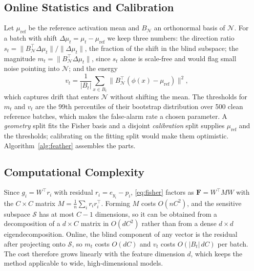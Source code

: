 \documentclass[conference]{IEEEtran}
\newcommand{\F}{\mathbf{F}}
\newcommand{\act}{\phi}
\begin{document}
\subsection{Online Statistics and Calibration}
\label{sec:stats}

Let $\mu_{\mathrm{ref}}$ be the reference activation mean and $B_\mathcal{N}$
an orthonormal basis of $\mathcal{N}$. For a batch with shift
$\Delta\mu_t = \mu_t - \mu_{\mathrm{ref}}$ we keep three numbers: the
direction ratio
$s_t = \lVert B_\mathcal{N}^\top \Delta\mu_t\rVert / \lVert \Delta\mu_t\rVert$,
the fraction of the shift in the blind subspace; the magnitude
$m_t = \lVert B_\mathcal{N}^\top \Delta\mu_t\rVert$, since $s_t$ alone is
scale-free and would flag small noise pointing into $\mathcal{N}$; and the
energy
\begin{equation}
  v_t = \frac{1}{|B_t|}\sum_{x \in B_t}
        \big\lVert B_\mathcal{N}^\top(\act(x) - \mu_{\mathrm{ref}})\big\rVert^2,
  \label{eq:energy}
\end{equation}
which captures drift that enters $\mathcal{N}$ without shifting the mean. The
thresholds for $m_t$ and $v_t$ are the 99th percentiles of their bootstrap
distribution over 500 clean reference batches, which makes the false-alarm
rate a chosen parameter. A \emph{geometry} split fits the Fisher basis and a
disjoint \emph{calibration} split supplies $\mu_{\mathrm{ref}}$ and the
thresholds; calibrating on the fitting split would make them optimistic.
Algorithm~\ref{alg:feather} assembles the parts.

\subsection{Computational Complexity}
\label{sec:complexity}

Since $g_i = W^\top r_i$ with residual $r_i = e_{y_i} - p_i$,
\eqref{eq:fisher} factors as $\F = W^\top M W$ with the $C \times C$ matrix
$M = \frac{1}{n}\sum_i r_i r_i^\top$. Forming $M$ costs $O(nC^2)$, and the
sensitive subspace $\mathcal{S}$ has at most $C-1$ dimensions, so it can be
obtained from a decomposition of a $d \times C$ matrix in $O(dC^2)$ rather
than from a dense $d \times d$ eigendecomposition. Online, the blind component
of any vector is the residual after projecting onto $\mathcal{S}$, so $m_t$
costs $O(dC)$ and $v_t$ costs $O(|B_t|\,dC)$ per batch. The cost therefore
grows linearly with the feature dimension $d$, which keeps the method
applicable to wide, high-dimensional models.
\end{document}
